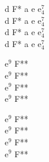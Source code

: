 \begin{chord}
    d F* a e $\mathrm{e^7_4}$\\
    d F* a e $\mathrm{e^7_4}$\\
    d F* a e $\mathrm{e^7_4}$\\
    d F* a e $\mathrm{e^7_4}$

    $\mathrm{e^9}$ F**\\
    $\mathrm{e^9}$ F**\\
    $\mathrm{e^9}$ F**\\
    $\mathrm{e^9}$ F**

    $\mathrm{e^9}$ F**\\
    $\mathrm{e^9}$ F**\\
    $\mathrm{e^9}$ F**\\
    $\mathrm{e^9}$ F**
\end{chord}
